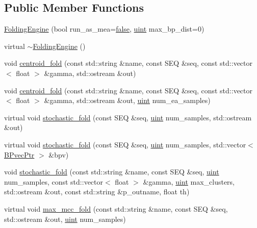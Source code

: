 \subsection*{Public Member Functions}
\begin{DoxyCompactItemize}
\item 
\hyperlink{class_folding_engine_a9a6458e4e231eec0ec99dbb1911f5c31}{Folding\+Engine} (bool run\+\_\+as\+\_\+mea=\hyperlink{naview_8c_a65e9886d74aaee76545e83dd09011727}{false}, \hyperlink{cyktable_8h_a91ad9478d81a7aaf2593e8d9c3d06a14}{uint} max\+\_\+bp\+\_\+dist=0)
\item 
virtual \hyperlink{class_folding_engine_afdd152a5f4e1b5d75b6387ee3e54e425}{$\sim$\+Folding\+Engine} ()
\item 
void \hyperlink{class_folding_engine_a0edbd0f9184ab489f04d415f3d259983}{centroid\+\_\+fold} (const std\+::string \&name, const S\+E\+Q \&seq, const std\+::vector$<$ float $>$ \&gamma, std\+::ostream \&out)
\item 
void \hyperlink{class_folding_engine_af45d59fc27e028e19a053a539c7e4254}{centroid\+\_\+fold} (const std\+::string \&name, const S\+E\+Q \&seq, const std\+::vector$<$ float $>$ \&gamma, std\+::ostream \&out, \hyperlink{cyktable_8h_a91ad9478d81a7aaf2593e8d9c3d06a14}{uint} num\+\_\+ea\+\_\+samples)
\item 
virtual void \hyperlink{class_folding_engine_af42fb74e518d56eaddaab33696b0d32f}{stochastic\+\_\+fold} (const S\+E\+Q \&seq, \hyperlink{cyktable_8h_a91ad9478d81a7aaf2593e8d9c3d06a14}{uint} num\+\_\+samples, std\+::ostream \&out)
\item 
virtual void \hyperlink{class_folding_engine_a3a83796b8f2eba402e90fb726c167680}{stochastic\+\_\+fold} (const S\+E\+Q \&seq, \hyperlink{cyktable_8h_a91ad9478d81a7aaf2593e8d9c3d06a14}{uint} num\+\_\+samples, std\+::vector$<$ \hyperlink{folding__engine_8h_ad0a64ba9a92681778af5917fd1bbd40c}{B\+Pvec\+Ptr} $>$ \&bpv)
\item 
void \hyperlink{class_folding_engine_a4c379f7308f4aae89369301fbc1d396a}{stochastic\+\_\+fold} (const std\+::string \&name, const S\+E\+Q \&seq, \hyperlink{cyktable_8h_a91ad9478d81a7aaf2593e8d9c3d06a14}{uint} num\+\_\+samples, const std\+::vector$<$ float $>$ \&gamma, \hyperlink{cyktable_8h_a91ad9478d81a7aaf2593e8d9c3d06a14}{uint} max\+\_\+clusters, std\+::ostream \&out, const std\+::string \&p\+\_\+outname, float th)
\item 
virtual void \hyperlink{class_folding_engine_a387a1625b31056030998eddcada4c036}{max\+\_\+mcc\+\_\+fold} (const std\+::string \&name, const S\+E\+Q \&seq, std\+::ostream \&out, \hyperlink{cyktable_8h_a91ad9478d81a7aaf2593e8d9c3d06a14}{uint} num\+\_\+samples)

\end{DoxyCompactItemize}
